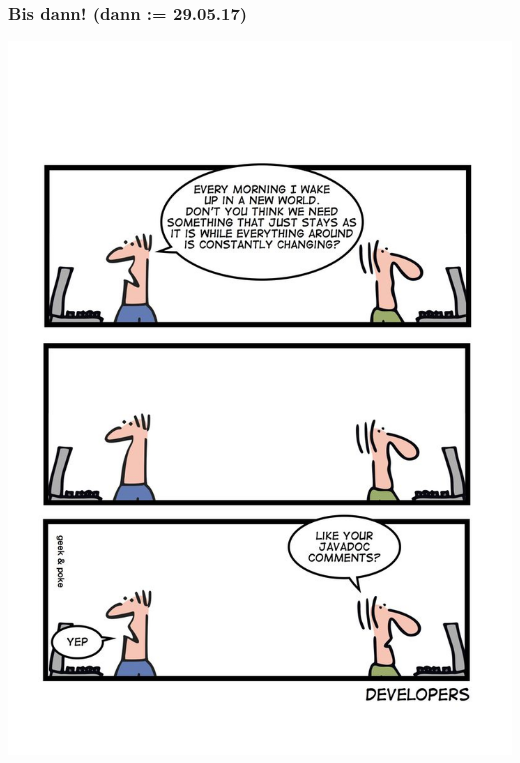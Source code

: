 \documentclass[18pt]{beamer}
\begin{document}
	\begin{frame}
		\frametitle{Bis dann! (dann := 29.05.17)}
		\centering
		\includegraphics[scale=0.85]{./comics/geek_and_poke_javadoc.jpg}
	\end{frame}
\end{document}
